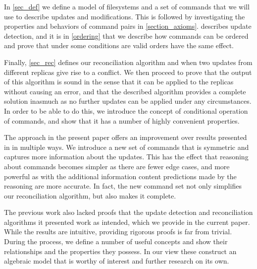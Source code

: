 In \cref{sec_def} we define a model of filesystems and a set of commands
that we will use to describe updates and modifications.
This is followed by investigating the properties and behaviors
of command pairs in \cref{section_axioms}.
 describes update detection, and it is
in \cref{ordering} that we describe how commands can be ordered
and prove that under some conditions are valid orders
have the same effect.

Finally, \cref{sec_rec} defines our reconciliation algorithm
and when two updates from different replicas give rise to a conflict.
We then proceed to prove that the output of this algorithm
is sound in the sense that 
it can be applied to the replicas without causing an error,
and that the described algorithm provides a complete solution
inasmuch as no further updates can be applied under any circumstances.
In order to be able to do this, we introduce
the concept of {\emph conditional operation} of commands,
and show that it has a number of highly convenient properties.

The approach in the present paper offers an improvement
over results presented in \cite{NREC} in multiple ways.
We introduce a new set of commands that is symmetric and
captures more information about the updates.
This has the effect that reasoning about commands
becomes simpler as there are fewer edge cases,
and more powerful as with the additional information
content predictions made by the reasoning are more accurate.
In fact, the new command set not only simplifies
our reconciliation algorithm, but also makes it complete.

The previous work also lacked proofs that the update detection
and reconciliation algorithms it presented work as intended,
which we provide in the current paper.
While the results are intuitive, providing rigorous proofs
is far from trivial.
During the process, we define a number of useful concepts
and show their relationships and the properties they possess.
In our view these construct an algebraic model
that is worthy of interest and further research on its own.

